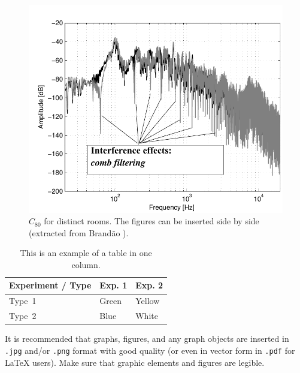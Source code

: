 \documentclass[12pt, a4paper, twoside, twocolumn]{article}
\begin{document}
\begin{figure}[htb!]
	\centering \vspace{-6mm}
        \includegraphics[width=0.98\linewidth,page=1]{figs/Combfilter-Brandao-2017-en.pdf}
        \vspace{-0.5em}
        \caption{$C_{80}$ for distinct rooms. The figures can be inserted side by side (extracted from Brandão \cite{Brandao-2017}).}
	\label{fig:C80}%
\end{figure}

\begin{table}[htb!]
  \centering {} \setlength\aboverulesep{0pt} \setlength\belowrulesep{0pt}
  \caption{This is an example of a table in one column.}
	\fontsize{11}{12}\selectfont 
    \begin{tabular}{| C{2.8cm} | C{1.8cm} | C{1.8cm} |}
    \hline
    \textbf{ Experiment / Type } & \textbf{Exp. 1} & \textbf{Exp. 2}\\
	\midrule
		Type~1 & Green & Yellow\\
		 Type~2 & Blue & White\\
		\hline
    \end{tabular}
    \label{tab.ex2}%
\end{table}%

It is recommended that graphs, figures, and any graph objects are inserted in \!\texttt{.jpg} and/or \texttt{.png} format with good quality (or even in vector form in \texttt{.pdf} for \LaTeX{}\xspace users). Make sure that graphic elements and figures are legible.
\end{document}
